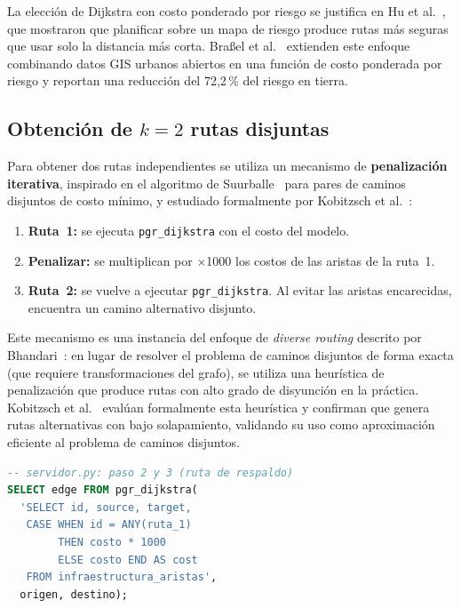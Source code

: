\documentclass[conference]{IEEEtran}
\begin{document}
La elección de Dijkstra con costo ponderado por riesgo se justifica en Hu et al.~\cite{hu2020}, que mostraron que planificar sobre un mapa de riesgo produce rutas más seguras que usar solo la distancia más corta. Braßel et al.~\cite{brassel2025} extienden este enfoque combinando datos GIS urbanos abiertos en una función de costo ponderada por riesgo y reportan una reducción del 72,2\,\% del riesgo en tierra.

\subsection{Obtención de $k=2$ rutas disjuntas}

Para obtener dos rutas independientes se utiliza un mecanismo de \textbf{penalización iterativa}, inspirado en el algoritmo de Suurballe~\cite{suurballe1974} para pares de caminos disjuntos de costo mínimo, y estudiado formalmente por Kobitzsch et al.~\cite{kobitzsch2013}:

\begin{enumerate}[label=\arabic*.,itemsep=2pt]
\item \textbf{Ruta~1:} se ejecuta \texttt{pgr\_dijkstra} con el costo del modelo.
\item \textbf{Penalizar:} se multiplican por $\times$1000 los costos de las aristas de la ruta~1.
\item \textbf{Ruta~2:} se vuelve a ejecutar \texttt{pgr\_dijkstra}. Al evitar las aristas encarecidas, encuentra un camino alternativo disjunto.
\end{enumerate}

Este mecanismo es una instancia del enfoque de \textit{diverse routing} descrito por Bhandari~\cite{bhandari1999}: en lugar de resolver el problema de caminos disjuntos de forma exacta (que requiere transformaciones del grafo), se utiliza una heurística de penalización que produce rutas con alto grado de disyunción en la práctica. Kobitzsch et al.~\cite{kobitzsch2013} evalúan formalmente esta heurística y confirman que genera rutas alternativas con bajo solapamiento, validando su uso como aproximación eficiente al problema de caminos disjuntos.

\begin{lstlisting}[language=SQL]
-- servidor.py: paso 2 y 3 (ruta de respaldo)
SELECT edge FROM pgr_dijkstra(
  'SELECT id, source, target,
   CASE WHEN id = ANY(ruta_1)
        THEN costo * 1000
        ELSE costo END AS cost
   FROM infraestructura_aristas',
  origen, destino);
\end{lstlisting}
\end{document}
